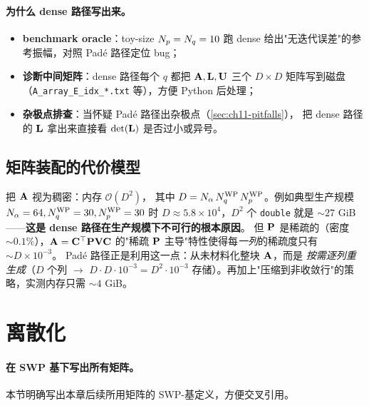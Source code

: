 \paragraph{为什么 dense 路径写出来。}
\begin{itemize}
  \item \textbf{benchmark oracle}：toy-size \(N_p=N_q=10\) 跑 dense
        给出"无迭代误差"的参考振幅，对照 Padé 路径定位 bug；
  \item \textbf{诊断中间矩阵}：dense 路径每个 \(q\) 都把
        \(\mathbf{A}, \mathbf{L}, \mathbf{U}\) 三个 \(D\times D\) 矩阵写到磁盘
        （\texttt{A\_array\_E\_idx\_*.txt} 等），方便 Python 后处理；
  \item \textbf{杂极点排查}：当怀疑 Padé 路径出杂极点（\cref{sec:ch11-pitfalls}），
        把 dense 路径的 \(\mathbf{L}\) 拿出来直接看
        \(\det(\mathbf{L})\) 是否过小或异号。
\end{itemize}

\subsection{矩阵装配的代价模型}
\label{subsec:ch11-cost}

把 \(\mathbf{A}\) 视为稠密：内存 \(\mathcal{O}(D^2)\)，
其中 \(D = N_\alpha\,{N_{q}^{\text{WP}}}\,{N_{p}^{\text{WP}}}\)。例如典型生产规模
\(N_\alpha = 64, {N_{q}^{\text{WP}}} = 30, {N_{p}^{\text{WP}}} = 30\) 时
\(D \approx 5.8 \times 10^4\)，\(D^2\) 个 \texttt{double}
就是 \(\sim\!27\) GiB——\textbf{这是 dense 路径在生产规模下不可行的根本原因}。
但 \(\mathbf{P}\) 是稀疏的（密度 \(\sim 0.1\%\)），\(\mathbf{A} = \mathbf{C}^\top \mathbf{P} \mathbf{V} \mathbf{C}\)
的"稀疏 \(\mathbf{P}\) 主导"特性使得每\emph{一列}的稀疏度只有 \(\sim D \times 10^{-3}\)。
Padé 路径正是利用这一点：从未材料化整块 \(\mathbf{A}\)，而是
\emph{按需逐列重生成}（\(D\) 个列 \(\to\) \(D \cdot D \cdot 10^{-3} = D^2 \cdot 10^{-3}\)
存储）。再加上"压缩到非收敛行"的策略，实测内存只需 \(\sim 4\) GiB。

\section{离散化}
\label{sec:ch11-discretization}

\paragraph{在 SWP 基下写出所有矩阵。}
本节明确写出本章后续所用矩阵的 SWP-基定义，方便交叉引用。

